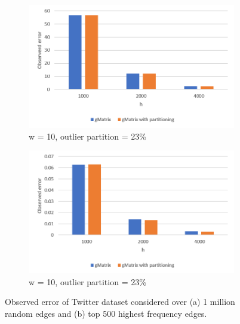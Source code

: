 \begin{figure}[!htbp]
\centering
\begin{subfigure}{.5\textwidth}
  \centering
  \includegraphics[width=1\linewidth]{T1}
  \caption{w = 10, outlier partition = 23\%}
  \label{fig:sub1}
\end{subfigure}%
\begin{subfigure}{.5\textwidth}
  \centering
  \includegraphics[width=1\linewidth]{T1T}
  \caption{w = 10, outlier partition = 23\%}
  \label{fig:sub2}
\end{subfigure}
\caption{Observed error of Twitter dataset considered over (a) 1 million random edges and (b) top 500 highest frequency edges.}
\label{fig:t1}
\end{figure}

